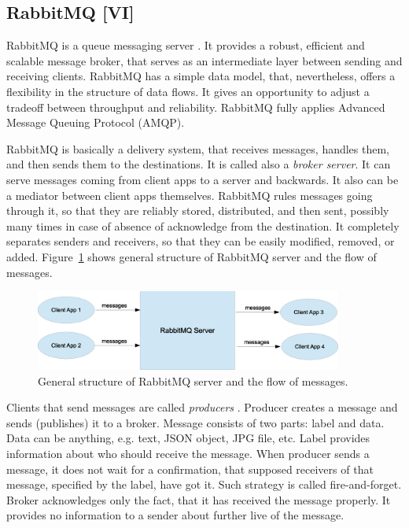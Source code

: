\subsection{RabbitMQ [VI]}

RabbitMQ is a queue messaging server \cite{RabbitMQ, AlvaroWilliams2012}.
It provides a robust, efficient and scalable message broker, that serves as an intermediate layer between sending and receiving clients.
RabbitMQ has a simple data model, that, nevertheless, offers a flexibility in the structure of data flows.
It gives an opportunity to adjust a tradeoff between throughput and reliability.
RabbitMQ fully applies Advanced Message Queuing Protocol (AMQP).

RabbitMQ is basically a delivery system, that receives messages, handles them, and then sends them to the destinations.
It is called also a \textit{broker server}.
It can serve messages coming from client apps to a server and backwards.
It also can be a mediator between client apps themselves.
RabbitMQ rules messages going through it, so that they are reliably stored, distributed, and then sent, possibly many times in case of absence of acknowledge from the destination.
It completely separates senders and receivers, so that they can be easily modified, removed, or added.
Figure~\ref{fig:RabbitMQGeneralStructure} shows general structure of RabbitMQ server and the flow of messages.

\begin{figure}[h]
  \centering
  \includegraphics [width=0.9\textwidth]{images/RabbitMQGeneralStructure}
  \caption{General structure of RabbitMQ server and the flow of messages.}
  \label{fig:RabbitMQGeneralStructure}
\end{figure}

Clients that send messages are called \textit{producers} .
Producer creates a message and sends (publishes) it to a broker.
Message consists of two parts: label and data.
Data can be anything, e.g. text, JSON object, JPG file, etc.
Label provides information about who should receive the message.
When producer sends a message, it does not wait for a confirmation, that supposed receivers of that message, specified by the label, have got it.
Such strategy is called fire-and-forget.
Broker acknowledges only the fact, that it has received the message properly.
It provides no information to a sender about further live of the message. 

